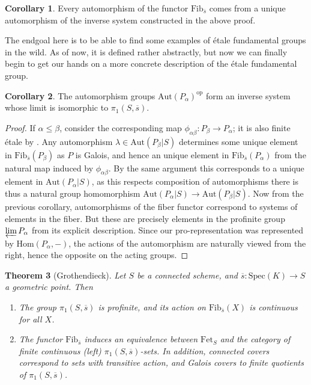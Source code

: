 \documentclass{article}
\newtheorem{theorem}{Theorem}[section]
\theoremstyle{definition}
\newtheorem{corollary}[theorem]{Corollary}
\theoremstyle{remark}
\theoremstyle{plain}
\begin{document}
\begin{corollary}
	Every automorphism of the functor $\text{Fib}_{\overline{s}}$ comes from a unique automorphism of the inverse system constructed in the above proof.
\end{corollary}

The endgoal here is to be able to find some examples of \'etale fundamental groups in the wild.
As of now, it is defined rather abstractly, but now we can finally begin to get our hands on a more concrete description of the \'etale fundamental group.

\begin{corollary}
	The automorphism groups $\text{Aut}(P_{\alpha})^{\text{op}}$ form an inverse system whose limit is isomorphic to $\pi_1(S, \overline{s})$.
\end{corollary}

\begin{proof}
	
	If $\alpha \leq \beta$, consider the corresponding map $\phi_{\alpha \beta}: P_{\beta} \to P_{\alpha}$; it is also finite \'etale by .
	Any automorphism $\lambda \in \text{Aut}(P_{\beta}|S)$ determines some unique element in $\text{Fib}_{\overline{s}}(P_{\beta})$ as $P$ is Galois, and hence an unique element in $\text{Fib}_{\overline{s}}(P_{\alpha})$ from the natural map induced by $\phi_{\alpha \beta}$.
By the same argument this corresponds to a unique element in $\text{Aut}(P_{\alpha}|S)$, as this respects composition of automorphisms there is thus a natural group homomorphism $\text{Aut}(P_{\alpha}|S) \to \text{Aut}(P_{\beta}|S)$.
Now from the previous corollary, automorphisms of the fiber functor correspond to systems of elements in the fiber.
But these are precisely elements in the profinite group $\varprojlim P_{\alpha}$ from its explicit description.
Since our pro-representation was represented by $\text{Hom}(P_{\alpha}, -)$, the actions of the automorphism are naturally viewed from the right, hence the opposite on the acting groups.
\end{proof}

\begin{theorem}[Grothendieck]
	Let $S$ be a connected scheme, and $\overline{s}: \text{Spec}(K) \to S$ a geometric point. Then \begin{enumerate} 
		\item The group $\pi_1(S, \overline{s})$ is profinite, and its action on $\text{Fib}_{\overline{s}}(X)$ is continuous for all $X$.
		\item The functor $\text{Fib}_{\overline{s}}$ induces an equivalence between $\text{Fet}_S$ and the category of finite continuous (left) $\pi_1(S, \overline{s})$-sets.	In addition, connected covers correspond to sets with transitive action, and Galois covers to finite quotients of $\pi_1(S, \overline{s})$.
 \end{enumerate} 
\end{theorem}
\end{document}
